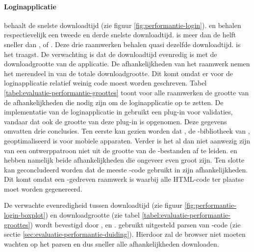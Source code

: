 \paragraph{Loginapplicatie}
\lungo{} behaalt de snelste downloadtijd (zie figuur \ref{fig:performantie-login}).
\jqm{} en \kendo{} behalen respectievelijk een tweede en derde snelste downloadtijd.
\lungo{} is meer dan de helft sneller dan \jqm{}, \kendo{} of \st{}.
Deze drie raamwerken behalen quasi dezelfde downloadtijd.
\st{} is het traagst.
De verwachting is dat de downloadtijd evenredig is met de downloadgrootte van de applicatie.
De afhankelijkheden van het raamwerk nemen het merendeel in van de totale downloadgrootte.
Dit komt omdat er voor de loginapplicatie relatief weinig code moest worden geschreven.
Tabel \ref{tabel:evaluatie-performantie-groottes} toont voor alle raamwerken de grootte van de afhankelijkheden die nodig zijn om de loginapplicatie op te zetten.
De implementatie van de loginapplicatie in \jqm{} gebruikt een plug-in voor validaties, vandaar dat ook de grootte van deze plug-in is opgenomen.
Deze gegevens omvatten drie conclusies.
Ten eerste kan gezien worden dat \quo{}, de \js{}-bibliotheek van \lungo{},  geoptimaliseerd is voor mobiele apparaten.
Verder is het al dan niet aanwezig zijn van een ontwerppatroon niet uit de grootte van de \js{}-bestanden af te leiden.
\kendo{} en \jqm{} hebben namelijk beide afhankelijkheden die ongeveer even groot zijn.
Ten slotte kan geconcludeerd worden dat \st{} de meeste \js-code gebruikt in zijn afhankelijkheden.
Dit komt omdat \st{} een \js-gedreven raamwerk is waarbij alle HTML-code ter plaatse moet worden gegenereerd.

De verwachte evenredigheid tussen downloadtijd (zie figuur \ref{fig:performantie-login-boxplot}) en downloadgrootte (zie tabel \ref{tabel:evaluatie-performantie-groottes}) wordt bevestigd door \kendo{}, \jqm{} en \lungo{}.
\st{} gebruikt uitgesteld parsen van \js{}-code (zie sectie \ref{sec:evaluatie-performantie-duiding}).
Hierdoor zal de browser niet moeten wachten op het parsen en dus sneller alle afhankelijkheden downloaden.

\begin{table}
\centering
{}
\caption{Grootte van de afhankelijkheden van de raamwerken voor het implementeren van de loginapplicatie.}
\label{tabel:evaluatie-performantie-groottes}
\end{table}



